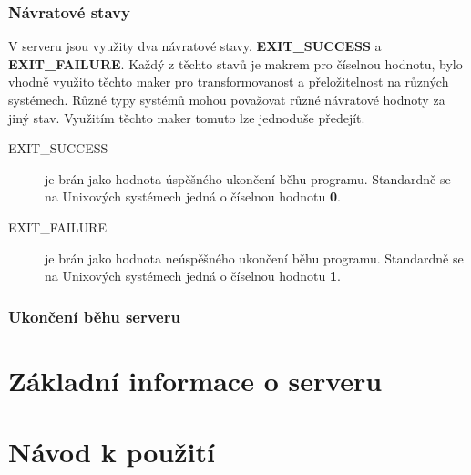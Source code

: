 \documentclass[11pt,a4paper]{report}
\begin{document}
\subsubsection{Návratové stavy}
V serveru jsou využity dva návratové stavy. \textbf{EXIT\_SUCCESS} a \textbf{EXIT\_FAILURE}. Každý z těchto stavů je makrem pro číselnou hodnotu, bylo vhodně využito těchto maker pro transformovanost a přeložitelnost na různých systémech. Různé typy systémů mohou považovat různé návratové hodnoty za jiný stav. Využitím těchto maker tomuto lze jednoduše předejít.
\begin{description}
\item [EXIT\_SUCCESS] je brán jako hodnota úspěšného ukončení běhu programu. Standardně se na Unixových systémech jedná o číselnou hodnotu \textbf{0}.
\label{itm:exitsuccess}
\item [EXIT\_FAILURE] je brán jako hodnota neúspěšného ukončení běhu programu. Standardně se na Unixových systémech jedná o číselnou hodnotu \textbf{1}.
\label{itm:exitfailure}
\end{description}
\subsubsection{Ukončení běhu serveru}
\section{Základní informace o serveru}
\section{Návod k použití}


\end{document}
